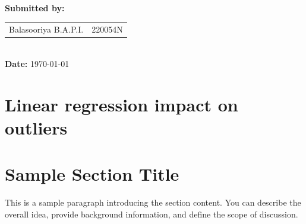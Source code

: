 \documentclass[12pt]{article}
\begin{document}
\begin{titlepage}
    \textbf{Submitted by:}\\
    \begin{tabular}{ll}
       Balasooriya B.A.P.I. & 220054N \\
    \end{tabular}\\[1cm]
    
    \textbf{Date:} \today

    \vfill
\end{titlepage}

\newpage
\tableofcontents
\newpage




\section{Linear regression impact on outliers}







\newpage
\section{Sample Section Title}
This is a sample paragraph introducing the section content.  
You can describe the overall idea, provide background information, and define the scope of discussion\cite{rayleigh1896sound}.
\end{document}
